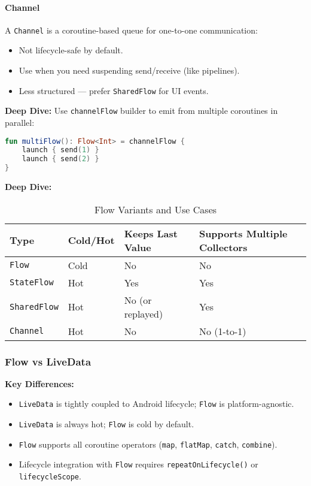 \documentclass[a4paper,12pt]{article}
\begin{document}
\paragraph{Channel}
A \texttt{Channel} is a coroutine-based queue for one-to-one communication:

\begin{itemize}
  \item Not lifecycle-safe by default.
  \item Use when you need suspending send/receive (like pipelines).
  \item Less structured — prefer \texttt{SharedFlow} for UI events.
\end{itemize}

\textbf{Deep Dive:}
Use \texttt{channelFlow} builder to emit from multiple coroutines in parallel:

\begin{lstlisting}[language=Kotlin]
fun multiFlow(): Flow<Int> = channelFlow {
    launch { send(1) }
    launch { send(2) }
}
\end{lstlisting}

\textbf{Deep Dive:}
\begin{table}[h!]
\centering
\begin{tabular}{|l|l|l|l|}
\hline
\textbf{Type} & \textbf{Cold/Hot} & \textbf{Keeps Last Value} & \textbf{Supports Multiple Collectors} \\
\hline
\texttt{Flow} & Cold & No & No \\
\texttt{StateFlow} & Hot & Yes & Yes \\
\texttt{SharedFlow} & Hot & No (or replayed) & Yes \\
\texttt{Channel} & Hot & No & No (1-to-1) \\
\hline
\end{tabular}
\caption{Flow Variants and Use Cases}
\end{table}

\subsubsection{Flow vs LiveData}

\textbf{Key Differences:}

\begin{itemize}
  \item \texttt{LiveData} is tightly coupled to Android lifecycle; \texttt{Flow} is platform-agnostic.
  \item \texttt{LiveData} is always hot; \texttt{Flow} is cold by default.
  \item \texttt{Flow} supports all coroutine operators (\texttt{map}, \texttt{flatMap}, \texttt{catch}, \texttt{combine}).
  \item Lifecycle integration with \texttt{Flow} requires \texttt{repeatOnLifecycle()} or \texttt{lifecycleScope}.
\end{itemize}
\end{document}
